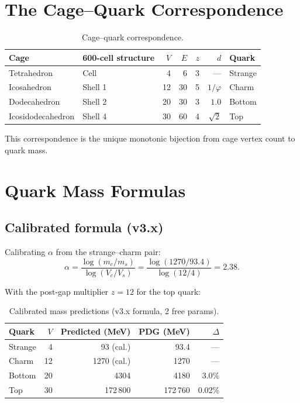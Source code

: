 \documentclass[11pt,letterpaper]{article}
\newcommand{\phig}{\varphi}
\begin{document}
\section{The Cage--Quark Correspondence}
\label{sec:correspondence}

\begin{table}[H]
\centering
\caption{Cage--quark correspondence.}
\label{tab:correspondence}
\begin{tabular}{@{}llrrrrl@{}}
\toprule
Cage & 600-cell structure & $V$ & $E$ & $z$ & $d$ & Quark \\
\midrule
Tetrahedron & Cell & 4 & 6 & 3 & --- & Strange \\
Icosahedron & Shell 1 & 12 & 30 & 5 & $1/\phig$ & Charm \\
Dodecahedron & Shell 2 & 20 & 30 & 3 & $1.0$ & Bottom \\
Icosidodecahedron & Shell 4 & 30 & 60 & 4 & $\sqrt{2}$ & Top \\
\bottomrule
\end{tabular}
\end{table}

This correspondence is the unique monotonic bijection from cage
vertex count to quark mass.

\section{Quark Mass Formulas}
\label{sec:mass}

\subsection{Calibrated formula (v3.x)}

Calibrating $\alpha$ from the strange--charm pair:
\begin{equation}
\alpha = \frac{\log(m_c/m_s)}{\log(V_c/V_s)}
       = \frac{\log(1270/93.4)}{\log(12/4)} = 2.38.
\label{eq:alpha}
\end{equation}

With the post-gap multiplier $z = 12$ for the top quark:

\begin{table}[H]
\centering
\caption{Calibrated mass predictions (v3.x formula, 2 free params).}
\label{tab:mass_v3}
\begin{tabular}{@{}lrrrr@{}}
\toprule
Quark & $V$ & Predicted (MeV) & PDG (MeV) & $\Delta$ \\
\midrule
Strange & 4  & 93 (cal.)   & 93.4   & --- \\
Charm   & 12 & 1270 (cal.) & 1270   & --- \\
Bottom  & 20 & 4304        & 4180   & 3.0\% \\
Top     & 30 & 172\,800    & 172\,760 & 0.02\% \\
\bottomrule
\end{tabular}
\end{table}
\end{document}
